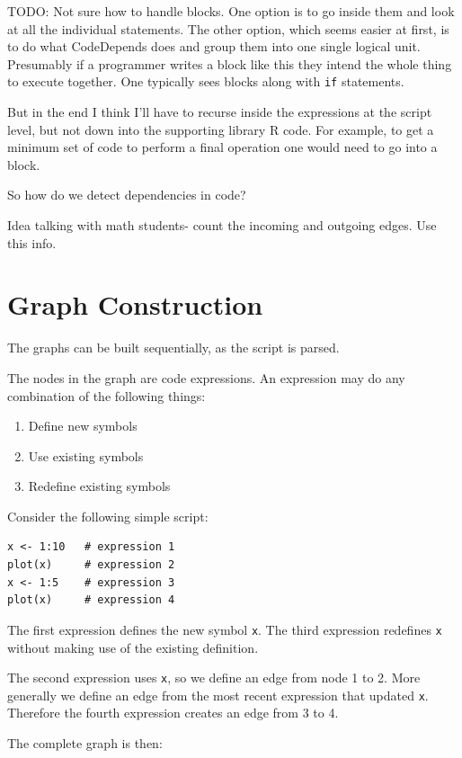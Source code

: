 \documentclass[12pt]{article}
\begin{document}
TODO: Not sure how to handle blocks. One option is to go inside them and
look at all the individual statements. The other option, which seems easier
at first, is to do what CodeDepends does and group them into one
single logical unit. Presumably if a programmer writes a block like this
they intend the whole thing to execute together. One typically sees blocks
along with \texttt{if} statements.

But in the end I think I'll have to recurse inside the expressions at the
script level, but not down into the supporting library R code. For example, to
get a minimum set of code to perform a final operation one would need to go
into a block.

So how do we detect dependencies in code?

Idea talking with math students- count the incoming and outgoing edges. Use
this info.

\section{Graph Construction}

The graphs can be built sequentially, as the script is parsed.

The nodes in the graph are code expressions.
An expression may do any combination of the following things:
\begin{enumerate}
    \item Define new symbols
    \item Use existing symbols
    \item Redefine existing symbols
\end{enumerate}

Consider the following simple script:

\begin{verbatim}
x <- 1:10   # expression 1
plot(x)     # expression 2
x <- 1:5    # expression 3
plot(x)     # expression 4
\end{verbatim}

The first expression defines the new symbol \texttt{x}. The third
expression redefines \texttt{x} without making use of the existing
definition.

The second expression uses \texttt{x}, so we define an edge from node 1 to 2.
More generally we define an edge from the most recent expression that
updated \texttt{x}. Therefore the fourth expression creates an edge from 3
to 4.

The complete graph is then:
\end{document}
